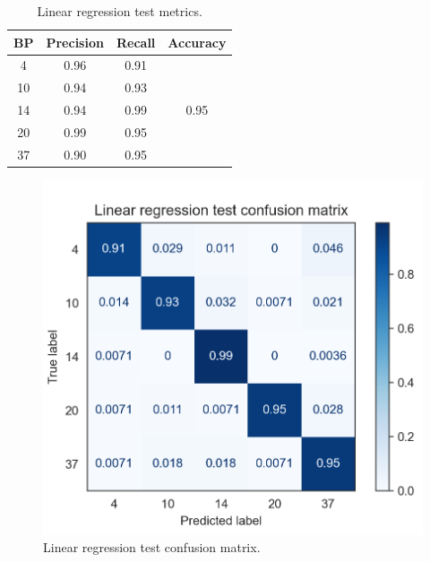 \documentclass[twocolumn]{article}
\begin{document}
                  \begin{table}[H]
                        \centering
                        \caption{Linear regression test metrics.}
                        \label{tab:ridge}
                        \begin{tabular}{c|cc|c}
                        BP & Precision & Recall & Accuracy              \\ \hline
                        4  & 0.96      & 0.91   & \multirow{5}{*}{0.95} \\
                        10 & 0.94      & 0.93   &                       \\
                        14 & 0.94      & 0.99   &                       \\
                        20 & 0.99      & 0.95   &                       \\
                        37 & 0.90      & 0.95   &                      
                        \end{tabular}
                  \end{table}

                  \begin{figure}[H]
                        \includegraphics[width=\linewidth]{ridge.png}
                        \caption{Linear regression test confusion matrix.}
                        \label{fig:rigde}
                  \end{figure}
\end{document}
